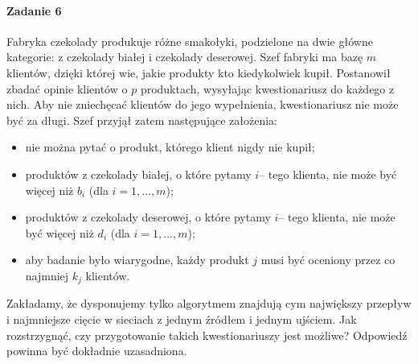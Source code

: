 \documentclass[a4paper,12pt]{article}
\theoremstyle{definition}%
\theoremstyle{definition}
\theoremstyle{problem}
\begin{document}
\paragraph{Zadanie 6} Fabryka czekolady produkuje różne smakołyki, podzielone na dwie główne kategorie: z czekolady białej i czekolady deserowej. Szef fabryki ma bazę $m$ klientów, dzięki której wie, jakie produkty kto kiedykolwiek kupił. Postanowił zbadać opinie klientów o $p$ produktach, wysyłając kwestionariusz do każdego z nich. Aby nie zniechęcać klientów do jego wypełnienia, kwestionariusz nie może być za długi. Szef przyjął zatem następujące założenia:
\begin{itemize}
\item nie można pytać o produkt, którego klient nigdy nie kupił;
\item produktów z czekolady białej, o które pytamy $i$– tego klienta, nie może być więcej niż $b_i$ (dla $i = 1, . . . , m$);
\item produktów z czekolady deserowej, o które pytamy $i$– tego klienta, nie może być więcej niż $d_i$ (dla $i = 1, . . . , m$);
\item aby badanie było wiarygodne, każdy produkt $j$ musi być oceniony przez co najmniej $k_j$ klientów.
\end{itemize}

Zakładamy, że dysponujemy tylko algorytmem znajdują cym największy przepływ i najmniejsze cięcie w sieciach z jednym źródłem i jednym ujściem. Jak rozstrzygnąć, czy przygotowanie takich kwestionariuszy jest możliwe? Odpowiedź powinna być dokładnie uzasadniona.
\end{document}
